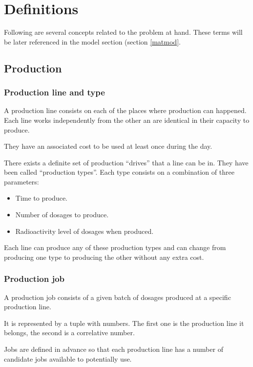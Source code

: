 \chapter{Definitions}
\label{def}

Following are several concepts related to the problem at hand. These terms will be later referenced in the model section (section \ref{matmod}.

\section{Production}

\subsection{Production line and type}
\label{def:lines}

A production line consists on each of the places where production can happened. Each line works independently from the other an are identical in their capacity to produce.

They have an associated cost to be used at least once during the day.

There exists a definite set of production "`drives"' that a line can be in. They have been called "`production types"'. Each type consists on a combination of three parameters:

\begin{itemize}
	\item Time to produce.
	\item Number of dosages to produce.
	\item Radioactivity level of dosages when produced.
\end{itemize}

Each line can produce any of these production types and can change from producing one type to producing the other without any extra cost.

\subsection{Production job}

A production job consists of a given batch of dosages produced at a specific production line.

It is represented by a tuple with numbers. The first one is the production line it belongs, the second is a correlative number.

Jobs are defined in advance so that each production line has a number of candidate jobs available to potentially use.


